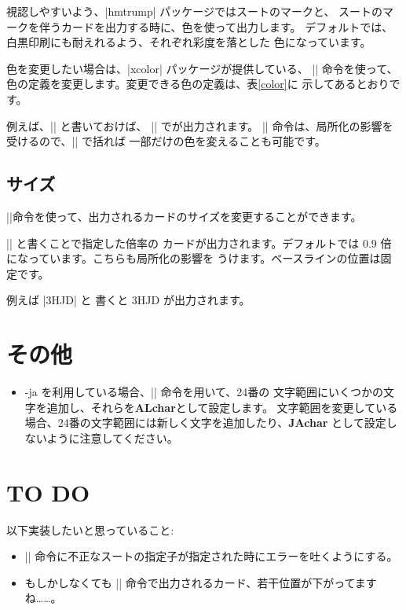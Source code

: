 \documentclass{jlreq}
\begin{document}
視認しやすいよう、|hmtrump| パッケージではスートのマークと、
スートのマークを伴うカードを出力する時に、色を使って出力します。
デフォルトでは、白黒印刷にも耐えれるよう、それぞれ彩度を落とした
色になっています。

色を変更したい場合は、|xcolor| パッケージが提供している、 |\definecolor|
命令を使って、色の定義を変更します。変更できる色の定義は、表\ref{color}に
示してあるとおりです。

例えば、|| と書いておけば、
|\hmH| で{\hmH}が出力されます。
|\definecolor| 命令は、局所化の影響を受けるので、|{}| で括れば
一部だけの色を変えることも可能です。

\subsection{サイズ}
|\tikzset|命令を使って、出力されるカードのサイズを変更することができます。

|| と書くことで指定した倍率の
カードが出力されます。デフォルトでは 0.9 倍になっています。こちらも局所化の影響を
うけます。ベースラインの位置は固定です。

例えば |{\trump 3H}\trump JD| と
書くと {\trump 3H}\trump JD が出力されます。

\section{その他}
\begin{itemize}
\item \LuaLaTeX-ja を利用している場合、|\ltjdefcharrange| 命令を用いて、24番の
	文字範囲にいくつかの文字を追加し、それらを\textbf{ALchar}として設定します。
	文字範囲を変更している場合、24番の文字範囲には新しく文字を追加したり、\textbf{JAchar}
	として設定しないように注意してください。
\end{itemize}

\section{TO DO}
以下実装したいと思っていること:
\begin{itemize}
\item |\trump| 命令に不正なスートの指定子が指定された時にエラーを吐くようにする。
\item もしかしなくても |\joker| 命令で出力されるカード、若干位置が下がってますね……。
\end{itemize}
\end{document}
